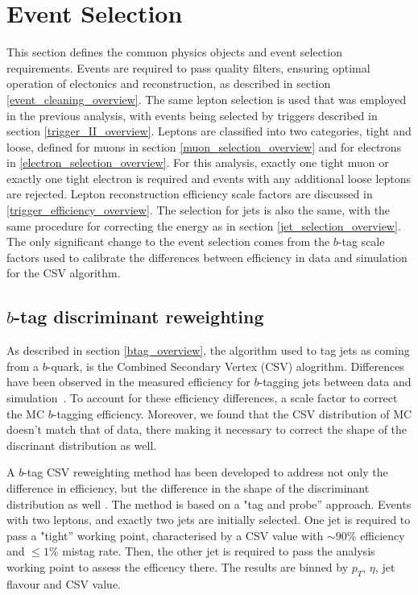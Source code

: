 \section{Event Selection}
\label{event_selection_II_overview}

\par This section defines the common physics objects and event
selection requirements.  Events are required to pass quality filters,
ensuring optimal operation of electonics and reconstruction, as
described in section \ref{event_cleaning_overview}.  The same lepton
selection is used that was employed in the previous analysis, with
events being selected by triggers described in section
\ref{trigger_II_overview}.  Leptons are classified into two
categories, tight and loose, defined for muons in section
\ref{muon_selection_overview} and for electrons in
\ref{electron_selection_overview}.  For this analysis, exactly one
tight muon or exactly one tight electron is required and events with 
any additional loose leptons are rejected.  Lepton reconstruction
efficiency scale factors are discussed
in \ref{trigger_efficiency_overview}.  The selection for jets is
also the same, with the same procedure for correcting the energy as in
section \ref{jet_selection_overview}.  The only significant change to
the event selection comes from the $b$-tag scale factors used to
calibrate the differences between efficiency in data and simulation
for the CSV algorithm.  

\subsection{$b$-tag discriminant reweighting}
\label{b_tag_reweighting_overveiw}

\par As described in section \ref{btag_overview}, the algorithm used
to tag jets as coming from a $b$-quark, is the Combined Secondary
Vertex (CSV) alogrithm.  Differences have been observed in the
measured efficiency for $b$-tagging jets between data and
simulation~\cite{CMS-PAS-BTV-11-004}.  To account for these efficiency
differences, a scale factor to correct the MC $b$-tagging
efficiency. Moreover, we found that the CSV distribution 
of MC doesn't match that of data, there making it necessary to correct
the shape of the discrinant distribution as well.  

\par A $b$-tag CSV reweighting method has been developed to address
not only the difference in efficiency, but the difference in the shape
of the discriminant distribution as well \cite{CMS-AN-2013-130}.  
The method is based on a "tag and probe'' approach.   Events with two
leptons, and exactly two jets are initially selected.  One jet is
required to pass a "tight'' working point, characterised by a CSV
value with $\sim90\%$ efficiency and $\le1\%$ mistag rate.  Then, the
other jet is required to pass the analysis working point to assess the
efficency there.  The results are binned by $p_{T}$, $\eta$, jet
flavour and CSV value.  

